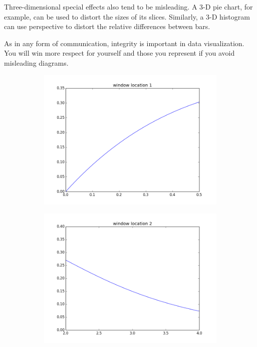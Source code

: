 Three-dimensional special effects also tend to be misleading. 
A 3-D pie chart, for example, can be used to distort the sizes of its slices. 
Similarly, a 3-D histogram can use perspective to distort the relative differences between bars.

As in any form of communication, integrity is important in data visualization. 
You will win more respect for yourself and those you represent if you avoid misleading diagrams.






\begin{figure}
\centering
\begin{subfigure}{.4\textwidth}
\centering
\includegraphics[width=\textwidth]{window_location_1.png}
\end{subfigure}
\begin{subfigure}{.4\textwidth}
\centering
\includegraphics[width=\textwidth]{window_location_2.png}

\end{subfigure}
\end{figure}
